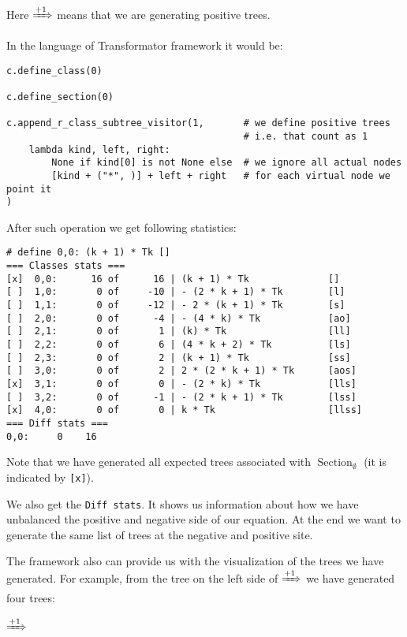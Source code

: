 \documentclass[final]{article}
\theoremstyle{definition}
\theoremstyle{definition}
\theoremstyle{remark}
\DeclareMathOperator{\tSection}{\text{Section}}
\newcommand{\includeinlinesvg}[2]{\begin{minipage}{#1\textwidth}\end{minipage}}
\begin{document}
Here \(\xRightarrow{+1}\) means that we are generating positive trees.

In the language of Transformator framework it would be:

\begin{lstlisting}
c.define_class(0)

c.define_section(0)

c.append_r_class_subtree_visitor(1,       # we define positive trees
                                          # i.e. that count as 1
    lambda kind, left, right:
        None if kind[0] is not None else  # we ignore all actual nodes
        [kind + ("*", )] + left + right   # for each virtual node we point it
)
\end{lstlisting}

After such operation we get following statistics:

\begin{lstlisting}
# define 0,0: (k + 1) * Tk []
=== Classes stats ===
[x]  0,0:      16 of      16 | (k + 1) * Tk              []
[ ]  1,0:       0 of     -10 | - (2 * k + 1) * Tk        [l]
[ ]  1,1:       0 of     -12 | - 2 * (k + 1) * Tk        [s]
[ ]  2,0:       0 of      -4 | - (4 * k) * Tk            [ao]
[ ]  2,1:       0 of       1 | (k) * Tk                  [ll]
[ ]  2,2:       0 of       6 | (4 * k + 2) * Tk          [ls]
[ ]  2,3:       0 of       2 | (k + 1) * Tk              [ss]
[ ]  3,0:       0 of       2 | 2 * (2 * k + 1) * Tk      [aos]
[x]  3,1:       0 of       0 | - (2 * k) * Tk            [lls]
[ ]  3,2:       0 of      -1 | - (2 * k + 1) * Tk        [lss]
[x]  4,0:       0 of       0 | k * Tk                    [llss]
=== Diff stats ===
0,0:     0    16
\end{lstlisting}

Note that we have generated all expected trees associated with \(\tSection_\emptyset\) (it is indicated by \verb|[x]|).

We also get the \verb|Diff stats|. It shows us information about how we have unbalanced the positive and negative side of our equation. At the end we want to generate the same list of trees at the negative and positive site.

The framework also can provide us with the visualization of the trees we have generated. For example, from the tree on the left side of \(\xRightarrow{+1}\) we have generated four trees:

\includeinlinesvg{.19}{lambda__trees_00__4_base}%
\(\xRightarrow{+1}\)%
\includeinlinesvg{.19}{lambda__trees_00__4}%
\includeinlinesvg{.19}{lambda__trees_00__5}%
\includeinlinesvg{.19}{lambda__trees_00__6}%
\includeinlinesvg{.19}{lambda__trees_00__7}%
\end{document}
